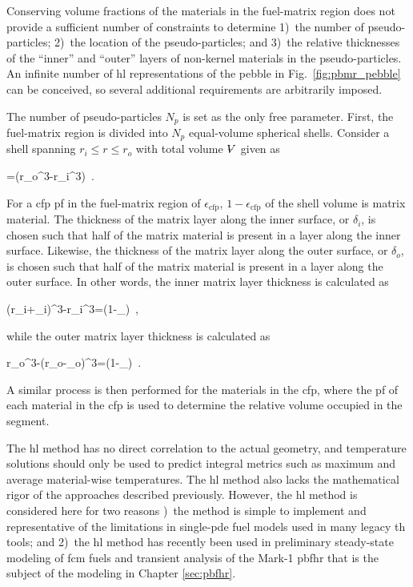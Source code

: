 Conserving volume fractions of the materials in the fuel-matrix region does not provide a sufficient number of constraints to determine 1)~the number of pseudo-particles; 2)~the location of the pseudo-particles; and 3)~the relative thicknesses of the ``inner'' and ``outer'' layers of non-kernel materials in the pseudo-particles. An infinite number of \gls{hl} representations of the pebble in Fig.\ \ref{fig:pbmr_pebble} can be conceived, so several additional requirements are arbitrarily imposed. 

The number of pseudo-particles \(N_p\) is set as the only free parameter. First, the fuel-matrix region is divided into \(N_p\) equal-volume spherical shells. Consider a shell spanning \(r_i\leq r\leq r_o\) with total volume \(\volume\) given as

\beq
\volume=\pi\left(r_o^3-r_i^3\right)\ .
\eeq

\noindent For a \gls{cfp} \gls{pf} in the fuel-matrix region of \(\epsilon_\text{cfp}\), \(1-\epsilon_\text{cfp}\) of the shell volume is matrix material. The thickness of the matrix layer along the inner surface, or \(\delta_i\), is chosen such that half of the matrix material is present in a layer along the inner surface. Likewise, the thickness of the matrix layer along the outer surface, or \(\delta_o\), is chosen such that half of the matrix material is present in a layer along the outer surface. In other words, the inner matrix layer thickness is calculated as

\beq
{}\pi\left\lbrack\left(r_i+\delta_i\right)^3-r_i^3\right\rbrack=\left(1-\epsilon_\right)\volume\ ,
\eeq

\noindent while the outer matrix layer thickness is calculated as

\beq
{}\pi\left\lbrack r_o^3-\left(r_o-\delta_o\right)^3\right\rbrack=\left(1-\epsilon_\right)\volume\ .
\eeq

\noindent A similar process is then performed for the materials in the \gls{cfp}, where the \gls{pf} of each material in the \gls{cfp} is used to determine the relative volume occupied in the segment.

The \gls{hl} method has no direct correlation to the actual geometry, and temperature solutions should only be used to predict integral metrics such as maximum and average material-wise temperatures. The \gls{hl} method also lacks the mathematical rigor of the approaches described previously. However, the \gls{hl} method is considered here for two reasons )~the method is simple to implement and representative of the limitations in single-\gls{pde} fuel models used in many legacy \gls{th} tools; and 2)~the \gls{hl} method has recently been used in preliminary steady-state modeling of \gls{fcm} fuels \cite{brown_fcm} and transient analysis of the Mark-1 \gls{pbfhr} \cite{xin_wang_thesis} that is the subject of the modeling in Chapter \ref{sec:pbfhr}.

